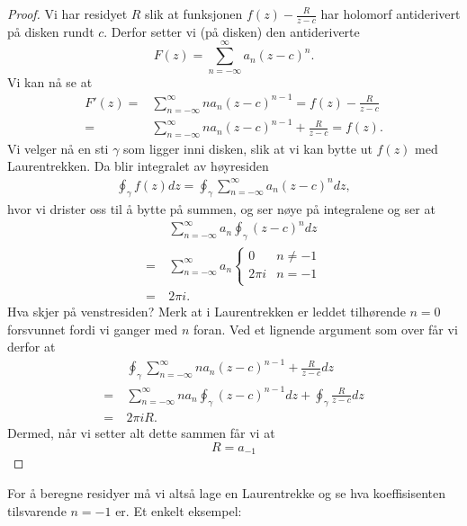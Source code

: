 \documentclass{article}
\begin{document}
\begin{proof}
    Vi har residyet $R$ slik at funksjonen $f(z) - \frac{R}{z - c}$ har holomorf antiderivert på disken rundt $c$. Derfor setter vi (på disken) den antideriverte 
    \[
        F(z) = \sum_{n = -\infty}^{\infty} a_n (z - c)^n.
    \]
    Vi kan nå se at
    \begin{align}
        F'(z) = & \sum_{n = -\infty}^{\infty} n a_n (z - c)^{n - 1} = f(z) - \frac{R}{z - c} \\
        = & \sum_{n = -\infty}^{\infty} n a_n (z - c)^{n - 1} + \frac{R}{z - c} = f(z).
    \end{align}
    Vi velger nå en sti $\gamma$ som ligger inni disken, slik at vi kan bytte ut $f(z)$ med Laurentrekken. Da blir integralet av høyresiden 
    \begin{align}
        \oint_\gamma f(z) dz = \oint_{\gamma} \sum_{n = -\infty}^{\infty} a_n (z - c)^{n} dz,  
    \end{align}
    hvor vi drister oss til å bytte på summen, og ser nøye på integralene og ser at
    \begin{align}
        & \sum_{n = -\infty}^{\infty} a_n \oint_{\gamma} (z - c)^{n} dz \\
        =\ & \sum_{n = -\infty}^{\infty} a_n \begin{cases}
            0 & n \neq -1 \\
            2 \pi i & n = -1 \\
        \end{cases} \\
        =\ & 2\pi i.
    \end{align}
    Hva skjer på venstresiden? Merk at i Laurentrekken er leddet tilhørende $n = 0$ forsvunnet fordi vi ganger med $n$ foran. Ved et lignende argument som over får vi derfor at 
    \begin{align}
        & \oint_{\gamma} \sum_{n = -\infty}^{\infty} n a_n (z - c)^{n - 1} + \frac{R}{z - c} dz \\
        =\ & \sum_{n = -\infty}^{\infty} n a_n \oint_{\gamma}  (z - c)^{n - 1} dz + \oint_{\gamma} \frac{R}{z - c} dz \\
        =\ & 2 \pi iR.
    \end{align}
    Dermed, når vi setter alt dette sammen får vi at
    \[
        R = a_{-1}
    \]
\end{proof}

For å beregne residyer må vi altså lage en Laurentrekke og se hva koeffisisenten tilsvarende $n = -1$ er. Et enkelt eksempel:
\end{document}
